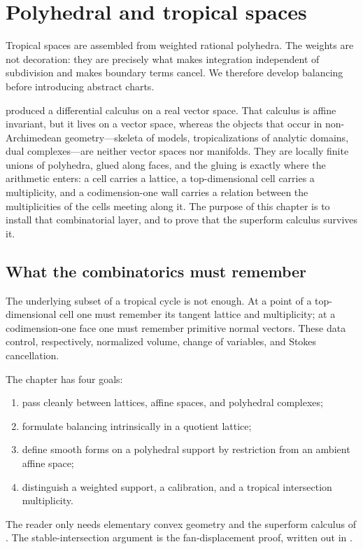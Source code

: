 \chapter{Polyhedral and tropical spaces}
\label{chap:tropical-spaces}

Tropical spaces are assembled from weighted rational polyhedra. The weights
are not decoration: they are precisely what makes integration independent of
subdivision and makes boundary terms cancel. We therefore develop balancing
before introducing abstract charts.

 produced a differential calculus on a real vector
space.  That calculus is affine invariant, but it lives on a vector space,
whereas the objects that occur in non-Archimedean geometry---skeleta of
models, tropicalizations of analytic domains, dual complexes---are neither
vector spaces nor manifolds.  They are locally finite unions of polyhedra, glued
along faces, and the gluing is exactly where the arithmetic enters: a cell
carries a lattice, a top-dimensional cell carries a multiplicity, and a
codimension-one wall carries a relation between the multiplicities of the
cells meeting along it.  The purpose of this chapter is to install that
combinatorial layer, and to prove that the superform calculus survives it.

\section{What the combinatorics must remember}

The underlying subset of a tropical cycle is not enough.  At a point of a
top-dimensional cell one must remember its tangent lattice and multiplicity;
at a codimension-one face one must remember primitive normal vectors.  These
data control, respectively, normalized volume, change of variables, and
Stokes cancellation.

The chapter has four goals:
\begin{enumerate}
\item pass cleanly between lattices, affine spaces, and polyhedral complexes;
\item formulate balancing intrinsically in a quotient lattice;
\item define smooth forms on a polyhedral support by restriction from an
  ambient affine space;
\item distinguish a weighted support, a calibration, and a tropical
  intersection multiplicity.
\end{enumerate}
The reader only needs elementary convex geometry and the superform calculus
of .  The stable-intersection argument is the
fan-displacement proof, written out in .

